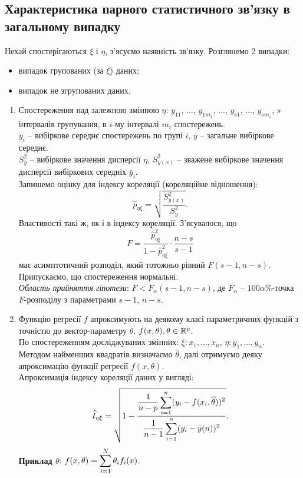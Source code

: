 \subsection{Характеристика парного статистичного зв'язку в загальному випадку}
Нехай спостерігаються $\xi$ і $\eta$, з'ясуємо наявність зв'язку. Розглянемо 2 випадки:
\begin{itemize}
	\item випадок групованих (за $\xi$) даних;
	\item випадок не згрупованих даних.
\end{itemize}
\begin{enumerate}
	\item Спостереження над залежною змінною $\eta$: $y_{11}$, $\ldots$, $y_{1m_1}$, $\ldots$, $y_{s1}$, $\ldots$, $y_{sm_s}$, $s$ інтервалів групування, в $i$-му інтервалі $m_i$ спостережень. \\

	$\bar{y}_i$ --  вибіркове середнє спостережень по групі $i$, $\bar{y}$ -- загальне вибіркове середнє. \\

	$S_y^2$ -- вибіркове значення дисперсії $\eta$, $S_{y(x)}^2$ -- зважене вибіркове значення дисперсії вибіркових середніх $\bar{y}_i$. \\

	Запишемо оцінку для індексу кореляції (кореляційне відношення): \[\widehat{p}_{\eta\xi}=\sqrt{\dfrac{S_{y(x)}^2}{S_y^2}}.\] Властивості такі ж, як і в індексу кореляції. З'ясувалося, що
	\[ F = \dfrac{\widehat{p}_{\eta\xi}^2}{1 - \widehat{p}_{\eta\xi}^2} \cdot \dfrac{n - s}{s - 1} \] має асимптотичний розподіл, який тотожньо рівний $F(s - 1, n - s)$. Припускаємо, що спостереження нормальні. \\

	\textit{Область прийняття гіпотези}: $F < F_\alpha(s - 1, n  -s)$, де $F_\alpha$ -- $100\alpha\%$-точка $F$-розподілу з параметрами $s - 1$, $n - s$.
	\item Функцію регресії $f$ апроксимують на деякому класі параметричних функцій з точністю до вектор-параметру $\theta$. $f (x,\theta),\theta \in\mathbb{R}^p$. \\

	По спостереженням досліджуваних змінних: $\xi: x_1, \ldots, x_n$, $\eta: y_1, \ldots, y_n$. \\

	Методом найменших квадратів визначаємо $\widehat{\theta}$, далі отримуємо деяку апроксимацію функції регресії $f (x,\theta)$. \\

	Апроксимація індексу кореляції даних у вигляді:
	\[ \widehat{I}_{\eta\xi} = \sqrt{1 - \dfrac{\dfrac{1}{n-p} \displaystyle\sum\limits_{i=1}^n (y_i - f(x_i, \widehat{\theta}))^2}{\dfrac{1}{n-1}\displaystyle\sum\limits_{i=1}^n (y_i-\bar{y}(n))^2}}. \]
	\textbf{Приклад $\theta$}: $f(x, \theta) = \displaystyle\sum\limits_{i=1}^N \theta_i f_i(x)$.
\end{enumerate}
